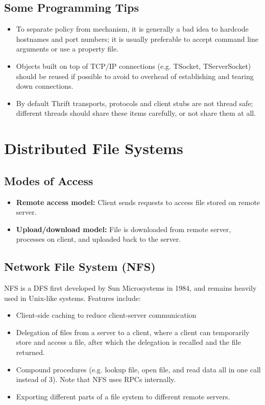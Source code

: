 \documentclass[12pt,titlepage]{article}
\begin{document}
    \subsection{Some Programming Tips}
      \begin{itemize}
        \item To separate policy from mechanism, it is generally a bad idea to hardcode hostnames and port numbers; it is usually preferable to accept command line
        arguments or use a property file.
        \item Objects built on top of TCP/IP connections (e.g. TSocket, TServerSocket) should be reused if possible to avoid to overhead of establishing and tearing
        down connections.
        \item By default Thrift transports, protocols and client stubs are not thread safe; different threads should share these items carefully, or not share them
        at all.
      \end{itemize}

  \section{Distributed File Systems}

    \subsection{Modes of Access}
      \begin{itemize}
        \item \textbf{Remote access model:} Client sends requests to access file stored on remote server.
        \item \textbf{Upload/download model:} File is downloaded from remote server, processes on client, and uploaded back to the server.
      \end{itemize}

    \subsection{Network File System (NFS)}
      NFS is a DFS first developed by Sun Microsystems in 1984, and remains heavily used in Unix-like systems. Features include:
      \begin{itemize}
        \item Client-side caching to reduce client-server communication
        \item Delegation of files from a server to a client, where a client can temporarily store and access a file, after which the delegation is recalled and
        the file returned.
        \item Compound procedures (e.g. lookup file, open file, and read data all in one call instead of 3). Note that NFS uses RPCs internally.
        \item Exporting different parts of a file system to different remote servers.
      \end{itemize}
\end{document}
